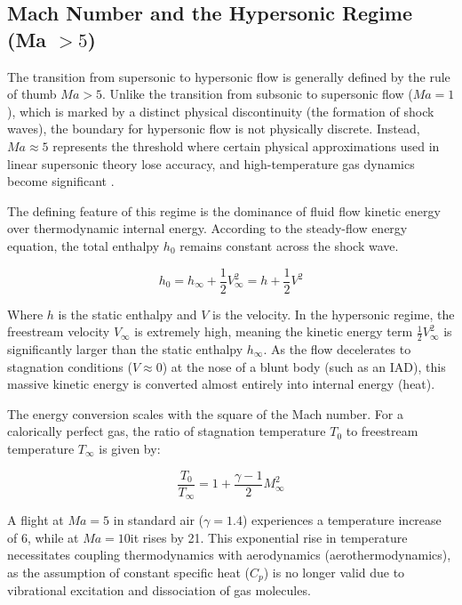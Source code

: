 \subsection{Mach Number and the Hypersonic Regime (\texorpdfstring{Ma $> 5$}{Ma > 5})}

The transition from supersonic to hypersonic flow is generally defined by the rule of thumb $Ma > 5$. Unlike the transition from subsonic to supersonic flow ($Ma = 1$), which is marked by a distinct physical discontinuity (the formation of shock waves), the boundary for hypersonic flow is not physically discrete. Instead, $Ma \approx 5$ represents the threshold where certain physical approximations used in linear supersonic theory lose accuracy, and high-temperature gas dynamics become significant \cite{AndersonHypersonic}.
\par

The defining feature of this regime is the dominance of fluid flow kinetic energy over thermodynamic internal energy. According to the steady-flow energy equation, the total enthalpy $h_0$ remains constant across the shock wave.

\begin{equation}
    h_0 = h_{\infty} + \frac{1}{2}V_{\infty}^2 = h + \frac{1}{2}V^2
\end{equation}

Where $h$ is the static enthalpy and $V$ is the velocity. In the hypersonic regime, the freestream velocity $V_{\infty}$ is extremely high, meaning the kinetic energy term $\frac{1}{2}V_{\infty}^2$ is significantly larger than the static enthalpy $h_{\infty}$. As the flow decelerates to stagnation conditions ($V \approx 0$) at the nose of a blunt body (such as an IAD), this massive kinetic energy is converted almost entirely into internal energy (heat).
\par
The energy conversion scales with the square of the Mach number. For a calorically perfect gas, the ratio of stagnation temperature $T_0$ to freestream temperature $T_{\infty}$ is given by:

\begin{equation}
    \frac{T_0}{T_{\infty}} = 1 + \frac{\gamma - 1}{2} M_{\infty}^2
\end{equation}
\par
A flight at $Ma = 5$ in standard air ($\gamma = 1.4$) experiences a temperature increase of 6, while at $Ma = 10$it rises by 21. This exponential rise in temperature necessitates coupling thermodynamics with aerodynamics (aerothermodynamics), as the assumption of constant specific heat ($C_p$) is no longer valid due to vibrational excitation and dissociation of gas molecules.

